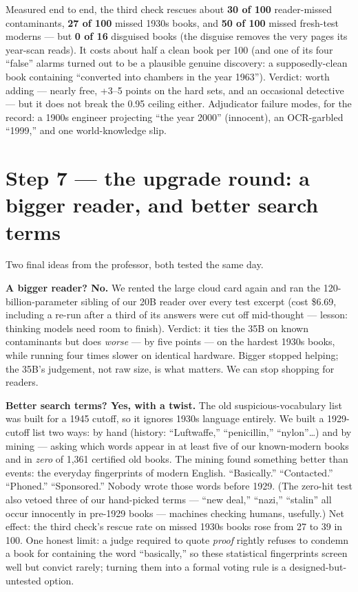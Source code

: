 \documentclass[11pt]{article}
\begin{document}
Measured end to end, the third check rescues about \textbf{30 of 100} reader-missed contaminants,
\textbf{27 of 100} missed 1930s books, and \textbf{50 of 100} missed fresh-test moderns --- but
\textbf{0 of 16} disguised books (the disguise removes the very pages its year-scan reads). It costs
about half a clean book per 100 (and one of its four ``false'' alarms turned out to be a plausible
genuine discovery: a supposedly-clean book containing ``converted into chambers in the year 1963'').
Verdict: worth adding --- nearly free, +3--5 points on the hard sets, and an occasional detective ---
but it does not break the 0.95 ceiling either. Adjudicator failure modes, for the record: a 1900s
engineer projecting ``the year 2000'' (innocent), an OCR-garbled ``1999,'' and one world-knowledge slip.

\section{Step 7 --- the upgrade round: a bigger reader, and better search terms}
Two final ideas from the professor, both tested the same day.

\textbf{A bigger reader? No.} We rented the large cloud card again and ran the 120-billion-parameter
sibling of our 20B reader over every test excerpt (cost \$6.69, including a re-run after a third of
its answers were cut off mid-thought --- lesson: thinking models need room to finish). Verdict: it
ties the 35B on known contaminants but does \emph{worse} --- by five points --- on the hardest 1930s
books, while running four times slower on identical hardware. Bigger stopped helping; the 35B's
judgement, not raw size, is what matters. We can stop shopping for readers.

\textbf{Better search terms? Yes, with a twist.} The old suspicious-vocabulary list was built for a
1945 cutoff, so it ignores 1930s language entirely. We built a 1929-cutoff list two ways: by hand
(history: ``Luftwaffe,'' ``penicillin,'' ``nylon''\ldots) and by mining --- asking which words appear
in at least five of our known-modern books and in \emph{zero} of 1,361 certified old books. The mining
found something better than events: the everyday fingerprints of modern English. ``Basically.''
``Contacted.'' ``Phoned.'' ``Sponsored.'' Nobody wrote those words before 1929. (The zero-hit test
also vetoed three of our hand-picked terms --- ``new deal,'' ``nazi,'' ``stalin'' all occur innocently
in pre-1929 books --- machines checking humans, usefully.) Net effect: the third check's rescue rate
on missed 1930s books rose from 27 to 39 in 100. One honest limit: a judge required to quote
\emph{proof} rightly refuses to condemn a book for containing the word ``basically,'' so these
statistical fingerprints screen well but convict rarely; turning them into a formal voting rule is a
designed-but-untested option.
\end{document}
